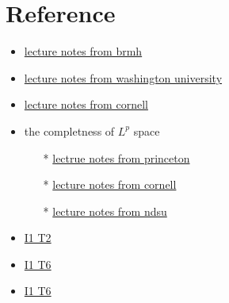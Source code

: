 \section{Reference}
\begin{itemize}
    \item \href{https://web.mat.bham.ac.uk/~malevao/MSM3P21/l10.pdf}{lecture notes from brmh}
    \item \href{https://sites.math.washington.edu/~burke/crs/555/555_notes/hilbert.pdf}{lecture notes from washington university}
    \item \href{https://e.math.cornell.edu/people/belk/measuretheory/BanachSpaces.pdf}{lecture notes from cornell}
    \item the completness of $L^p$ space
    \begin{itemize}
        \item[*] \href{https://assets.press.princeton.edu/chapters/s9627.pdf}{lectrue notes from princeton}
        \item[*] \href{https://e.math.cornell.edu/people/belk/measuretheory/LpFunctions.pdf}{lecture notes from cornell}
        \item[*] \href{https://www.ndsu.edu/pubweb/~littmann/Topics15/class8-28.pdf}{lecture notes from ndsu} 
    \end{itemize}
    \item \href{https://math.stackexchange.com/questions/3886899/prove-that-l2i-is-a-hilbert-space}{I1 T2}
    \item \href{https://www.math.wustl.edu/~wick/teaching/math6338/math6338_hw1.pdf}{I1 T6}
    \item \href{https://www.math.byu.edu/~jwest/teaching/winter2009/math391R/latex/645-Homework01.pdf}{I1 T6}
\end{itemize}